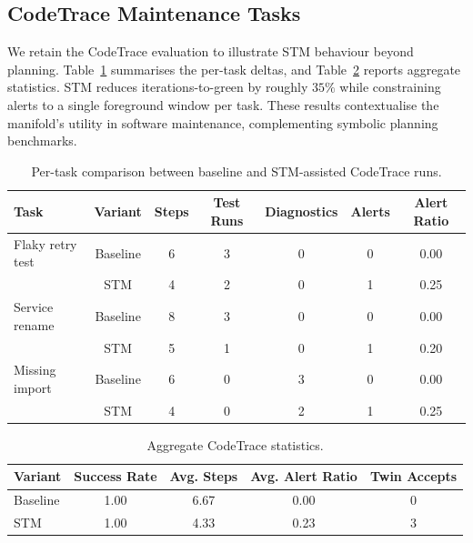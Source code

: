 \documentclass[11pt]{article}
\begin{document}
\subsection{CodeTrace Maintenance Tasks}
We retain the CodeTrace evaluation to illustrate STM behaviour beyond planning.
Table~\ref{tab:codetrace-per-task} summarises the per-task deltas, and
Table~\ref{tab:codetrace-aggregate} reports aggregate statistics. STM reduces
iterations-to-green by roughly $35\%$ while constraining alerts to a single
foreground window per task. These results contextualise the manifold's utility in
software maintenance, complementing symbolic planning benchmarks.

\begin{table}[h]
  \centering
  \caption{Per-task comparison between baseline and STM-assisted CodeTrace runs.}
  \label{tab:codetrace-per-task}
  \begin{tabular}{lcccccc}
    \toprule
    Task & Variant & Steps & Test Runs & Diagnostics & Alerts & Alert Ratio \\
    \midrule
    Flaky retry test & Baseline & 6 & 3 & 0 & 0 & 0.00 \\
                      & STM & 4 & 2 & 0 & 1 & 0.25 \\
    Service rename & Baseline & 8 & 3 & 0 & 0 & 0.00 \\
                   & STM & 5 & 1 & 0 & 1 & 0.20 \\
    Missing import & Baseline & 6 & 0 & 3 & 0 & 0.00 \\
                   & STM & 4 & 0 & 2 & 1 & 0.25 \\
    \bottomrule
  \end{tabular}
\end{table}

\begin{table}[h]
  \centering
  \caption{Aggregate CodeTrace statistics.}
  \label{tab:codetrace-aggregate}
  \begin{tabular}{lcccc}
    \toprule
    Variant & Success Rate & Avg. Steps & Avg. Alert Ratio & Twin Accepts \\
    \midrule
    Baseline & 1.00 & 6.67 & 0.00 & 0 \\
    STM & 1.00 & 4.33 & 0.23 & 3 \\
    \bottomrule
  \end{tabular}
\end{table}
\end{document}
